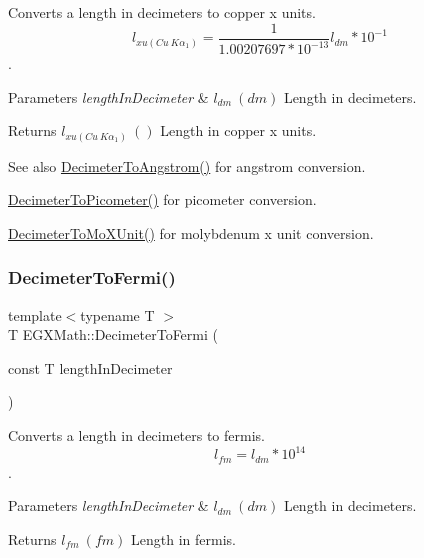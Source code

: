 Converts a length in decimeters to copper x units. \[ l_{xu(Cu\ K\alpha_1)}= \frac{1}{1.00207697*10^{-13}} l_{dm} * 10^{-1}\]. 


\begin{DoxyParams}{Parameters}
{\em length\+In\+Decimeter} & $ l_{dm}\ (dm)$ Length in decimeters. \\
\hline
\end{DoxyParams}
\begin{DoxyReturn}{Returns}
$ l_{xu(Cu\ K\alpha_1)}\ ()$ Length in copper x units. 
\end{DoxyReturn}
\begin{DoxySeeAlso}{See also}
\mbox{\hyperlink{group___e_g_x_math-_conversions-_length_conversions-_decimeter-_non-_s_i_gaffa5876e4f15bc859c369e8bfb9e4183}{Decimeter\+To\+Angstrom()}} for angstrom conversion. 

\mbox{\hyperlink{group___e_g_x_math-_conversions-_length_conversions-_decimeter-_s_i_gaac5fa4b7b538abe2d19f33e131e9bbde}{Decimeter\+To\+Picometer()}} for picometer conversion. 

\mbox{\hyperlink{group___e_g_x_math-_conversions-_length_conversions-_decimeter-_non-_s_i_ga609f53e09c9a767639da3ad72905bb71}{Decimeter\+To\+Mo\+X\+Unit()}} for molybdenum x unit conversion. 
\end{DoxySeeAlso}
\mbox{\label{group___e_g_x_math-_conversions-_length_conversions-_decimeter-_non-_s_i_ga2163b07afe9c89c1a1150516f615ef2a}} 
\subsubsection{\texorpdfstring{Decimeter\+To\+Fermi()}{DecimeterToFermi()}}
{\footnotesize\ttfamily template$<$typename T $>$ \\
T E\+G\+X\+Math\+::\+Decimeter\+To\+Fermi (\begin{DoxyParamCaption}\item[{const T}]{length\+In\+Decimeter }\end{DoxyParamCaption})}



Converts a length in decimeters to fermis. \[ l_{fm}=l_{dm} * 10^{14} \]. 


\begin{DoxyParams}{Parameters}
{\em length\+In\+Decimeter} & $ l_{dm}\ (dm)$ Length in decimeters. \\
\hline
\end{DoxyParams}
\begin{DoxyReturn}{Returns}
$ l_{fm}\ (fm)$ Length in fermis. 
\end{DoxyReturn}
\mbox{\label{group___e_g_x_math-_conversions-_length_conversions-_decimeter-_non-_s_i_gaebafc6e167156bb5158e5d335b25334b}} 
